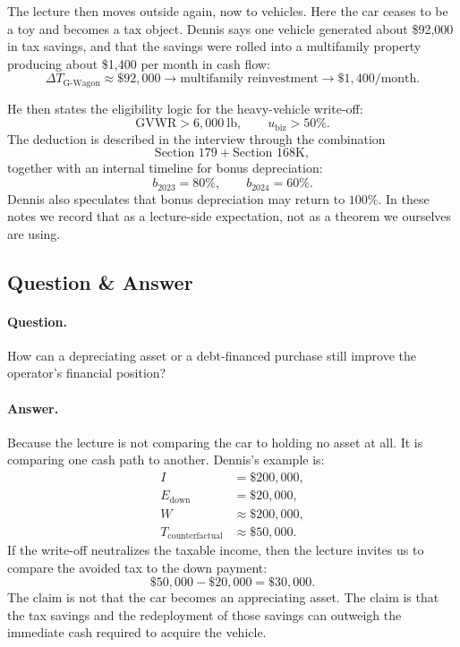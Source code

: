 The lecture then moves outside again, now to vehicles. Here the car ceases to be a toy and becomes a tax object. Dennis says one vehicle generated about \$92{,}000 in tax savings, and that the savings were rolled into a multifamily property producing about \$1{,}400 per month in cash flow:
\begin{equation}
\Delta T_{\mathrm{G\text{-}Wagon}} \approx \$92{,}000
\to
\text{multifamily reinvestment}
\to
\$1{,}400/\text{month}.
\end{equation}

He then states the eligibility logic for the heavy-vehicle write-off:
\begin{equation}
\mathrm{GVWR} > 6{,}000\ \text{lb},
\qquad
u_{\mathrm{biz}} > 50\%.
\end{equation}
The deduction is described in the interview through the combination
\begin{equation}
\text{Section }179 + \text{Section }168\mathrm{K},
\end{equation}
together with an internal timeline for bonus depreciation:
\begin{equation}
b_{2023}=80\%,
\qquad
b_{2024}=60\%.
\end{equation}
Dennis also speculates that bonus depreciation may return to \(100\%\). In these notes we record that as a lecture-side expectation, not as a theorem we ourselves are using.

\subsection{Question \& Answer}

\paragraph{Question.} How can a depreciating asset or a debt-financed purchase still improve the operator's financial position?

\paragraph{Answer.} Because the lecture is not comparing the car to holding no asset at all. It is comparing one cash path to another. Dennis's example is:
\begin{align}
I &= \$200{,}000, \\
E_{\mathrm{down}} &= \$20{,}000, \\
W &\approx \$200{,}000, \\
T_{\mathrm{counterfactual}} &\approx \$50{,}000.
\end{align}
If the write-off neutralizes the taxable income, then the lecture invites us to compare the avoided tax to the down payment:
\begin{equation}
\$50{,}000 - \$20{,}000 = \$30{,}000.
\end{equation}
The claim is not that the car becomes an appreciating asset. The claim is that the tax savings and the redeployment of those savings can outweigh the immediate cash required to acquire the vehicle.

